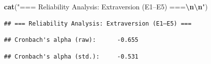 \documentclass[
]{article}
\newenvironment{Shaded}{\begin{snugshade}}{\end{snugshade}}
\newcommand{\DecValTok}[1]{\textcolor[rgb]{0.00,0.00,0.81}{#1}}
\newcommand{\FunctionTok}[1]{\textcolor[rgb]{0.13,0.29,0.53}{\textbf{#1}}}
\newcommand{\NormalTok}[1]{#1}
\newcommand{\SpecialCharTok}[1]{\textcolor[rgb]{0.81,0.36,0.00}{\textbf{#1}}}
\newcommand{\StringTok}[1]{\textcolor[rgb]{0.31,0.60,0.02}{#1}}
\begin{document}
\begin{Shaded}
\begin{Highlighting}[]
\FunctionTok{cat}\NormalTok{(}\StringTok{"=== Reliability Analysis: Extraversion (E1–E5) ===}\SpecialCharTok{\textbackslash{}n\textbackslash{}n}\StringTok{"}\NormalTok{)}
\end{Highlighting}
\end{Shaded}

\begin{verbatim}
## === Reliability Analysis: Extraversion (E1–E5) ===
\end{verbatim}

\begin{Shaded}
\end{Shaded}

\begin{verbatim}
## Cronbach's alpha (raw):      -0.655
\end{verbatim}

\begin{Shaded}
\end{Shaded}

\begin{verbatim}
## Cronbach's alpha (std.):     -0.531
\end{verbatim}

\begin{Shaded}
\end{Shaded}
\end{document}
